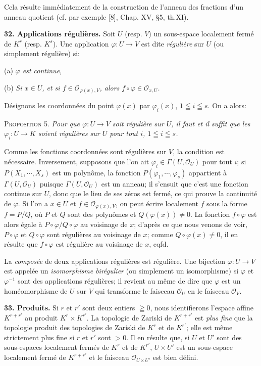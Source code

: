 Cela résulte immédiatement de la construction de l'anneau des fractions d'un anneau quotient (cf. par exemple [8], Chap. XV, §5, th.XI).

\textbf{32. Applications régulières.} Soit $U$ (resp. $V$) un sous-espace localement fermé de $K^r$ (resp. $K^s$). Une application $\varphi\colon U \to V$ est dite \textit{régulière} sur $U$ (ou simplement régulière) si:

(a) \textit{$\varphi$ est continue,}

(b) \textit{Si $x \in U$, et si $f \in \mathcal{O}_{\varphi(x),V}$, alors $f \circ \varphi \in \mathcal{O}_{x,U}$.}

Désignons les coordonnées du point $\varphi(x)$ par $\varphi_i(x)$, $1 \leqq i \leqq s$. On a alors:

\textsc{Proposition 5.} \textit{Pour que $\varphi\colon U \to V$ soit régulière sur $U$, il faut et il suffit que les $\varphi_i\colon U \to K$ soient régulières sur $U$ pour tout $i$, $1 \leqq i \leqq s$.}

Comme les fonctions coordonnées sont régulières sur $V$, la condition est nécessaire. Inversement, supposons que l'on ait $\varphi_i \in \Gamma(U, \mathcal{O}_U)$ pour tout $i$; si $P(X_1, \cdots, X_s)$ est un polynôme, la fonction $P(\varphi_1, \cdots, \varphi_s)$ appartient à $\Gamma(U, \mathcal{O}_U)$ puisque $\Gamma(U, \mathcal{O}_U)$ est un anneau; il s'ensuit que c'est une fonction continue sur $U$, donc que le lieu de ses zéros est fermé, ce qui prouve la continuité de $\varphi$. Si l'on a $x \in U$ et $f \in \mathcal{O}_{\varphi(x),V}$, on peut écrire localement $f$ sous la forme $f = P/Q$, où $P$ et $Q$ sont des polynômes et $Q(\varphi(x)) \neq 0$. La fonction $f \circ \varphi$ est alors égale à $P \circ \varphi/Q \circ \varphi$ au voisinage de $x$; d'après ce que nous venons de voir, $P \circ \varphi$ et $Q \circ \varphi$ sont régulières au voisinage de $x$; comme $Q \circ \varphi(x) \neq 0$, il en résulte que $f \circ \varphi$ est régulière au voisinage de $x$, cqfd.

La \textit{composée} de deux applications régulières est régulière. Une bijection $\varphi\colon U \to V$ est appelée un \textit{isomorphisme birégulier} (ou simplement un isomorphisme) si $\varphi$ et $\varphi^{-1}$ sont des applications régulières; il revient au même de dire que $\varphi$ est un homéomorphisme de $U$ sur $V$ qui transforme le faisceau $\mathcal{O}_U$ en le faisceau $\mathcal{O}_V$.

\textbf{33. Produits.} Si $r$ et $r'$ sont deux entiers $\geqq 0$, nous identifierons l'espace affine $K^{r+r'}$ au produit $K^r \times K^{r'}$. La topologie de Zariski de $K^{r+r'}$ est \textit{plus fine} que la topologie produit des topologies de Zariski de $K^r$ et de $K^{r'}$; elle est même
strictement plus fine si $r$ et $r'$ sont $>0$. Il en résulte que, si $U$ et $U'$ sont des sous-espaces localement fermés de $K^r$ et de $K^{r'}$, $U \times U'$ est un sous-espace localement fermé de $K^{r+r'}$ et le faisceau $\mathcal{O}_{U \times U'}$ est bien défini.

